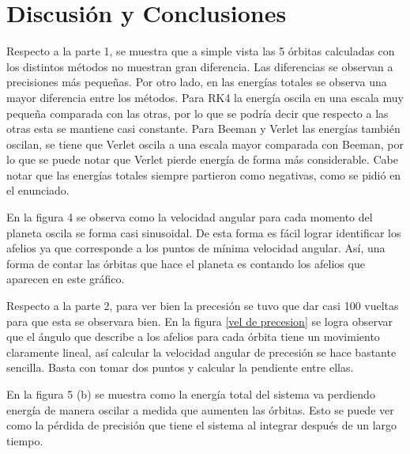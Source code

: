 \documentclass[letterpaper,oneside]{article}
\begin{document}
\section{Discusión y Conclusiones}

Respecto a la parte 1, se muestra que a simple vista las 5 órbitas calculadas con los distintos métodos no muestran gran diferencia. Las diferencias se observan a precisiones más pequeñas. Por otro lado, en las energías totales se observa una mayor diferencia entre los métodos. Para RK4 la energía oscila en una escala muy pequeña comparada con las otras, por lo que se podría decir que respecto a las otras esta se mantiene casi constante. Para Beeman y Verlet las energías también oscilan, se tiene que Verlet oscila a una escala mayor comparada con Beeman, por lo que se puede notar que Verlet pierde energía de forma más considerable. Cabe notar que las energías totales siempre partieron como negativas, como se pidió en el enunciado.

En la figura 4 se observa como la velocidad angular para cada momento del planeta oscila se forma casi sinusoidal. De esta forma es fácil lograr identificar los afelios ya que corresponde a los puntos de mínima velocidad angular. Así, una forma de contar las órbitas que hace el planeta es contando los afelios que aparecen en este gráfico.

Respecto a la parte 2, para ver bien la precesión se tuvo que dar casi 100 vueltas para que esta se observara bien. En la figura \ref{vel de precesion} se logra observar que el ángulo que describe a los afelios para cada órbita tiene un movimiento claramente lineal, así calcular la velocidad angular de precesión se hace bastante sencilla. Basta con tomar dos puntos y calcular la pendiente entre ellas.

En la figura 5 (b) se muestra como la energía total del sistema va perdiendo energía de manera oscilar a medida que aumenten las órbitas. Esto se puede ver como la pérdida de precisión que tiene el sistema al integrar después de un largo tiempo. 


\end{document}
